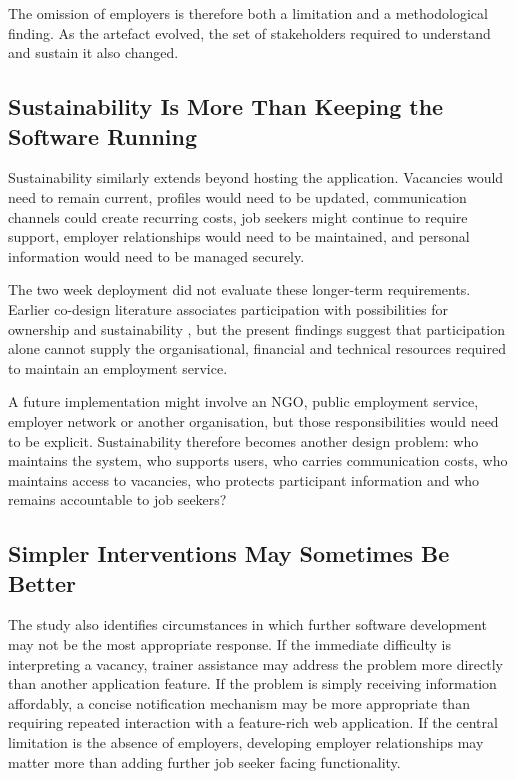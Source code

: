 The omission of employers is therefore both a limitation and a methodological finding. As the artefact evolved, the set of stakeholders required to understand and sustain it also changed.


\subsection{Sustainability Is More Than Keeping the Software Running}

Sustainability similarly extends beyond hosting the application. Vacancies would need to remain current, profiles would need to be updated, communication channels could create recurring costs, job seekers might continue to require support, employer relationships would need to be maintained, and personal information would need to be managed securely.

The two week deployment did not evaluate these longer-term requirements. Earlier co-design literature associates participation with possibilities for ownership and sustainability \cite{david2013,ssozi2017}, but the present findings suggest that participation alone cannot supply the organisational, financial and technical resources required to maintain an employment service.

A future implementation might involve an NGO, public employment service, employer network or another organisation, but those responsibilities would need to be explicit. Sustainability therefore becomes another design problem: who maintains the system, who supports users, who carries communication costs, who maintains access to vacancies, who protects participant information and who remains accountable to job seekers?


\subsection{Simpler Interventions May Sometimes Be Better}

The study also identifies circumstances in which further software development may not be the most appropriate response. If the immediate difficulty is interpreting a vacancy, trainer assistance may address the problem more directly than another application feature. If the problem is simply receiving information affordably, a concise notification mechanism may be more appropriate than requiring repeated interaction with a feature-rich web application. If the central limitation is the absence of employers, developing employer relationships may matter more than adding further job seeker facing functionality.

